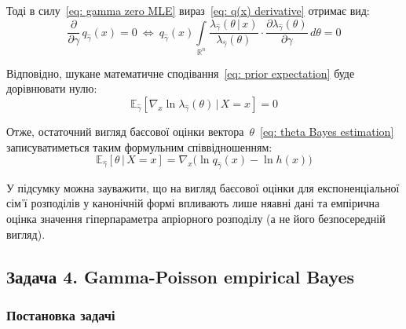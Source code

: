 \documentclass{mathreport}
\begin{document}
Тоді в силу~\eqref{eq: gamma zero MLE} вираз~\eqref{eq: q(x) derivative} отримає вид:
\begin{equation}
    \frac{\partial}{\partial \gamma}\, q_{\widehat{\gamma}}(x) = 0 
    \ \Longleftrightarrow \ 
    q_{\widehat{\gamma}}(x) \int\limits_{\mathbb{R}^n} \frac{\lambda_{\widehat{\gamma}}(\theta \,|\, x)}{\lambda_{\widehat{\gamma}}(\theta)} \cdot \frac{\partial \lambda_{\widehat{\gamma}}(\theta)}{\partial \gamma} \, d\theta = 0
\end{equation}

Відповідно, шукане математичне сподівання~\eqref{eq: prior expectation} буде дорівнювати нулю:
\begin{equation}
    \mathbb{E}_{\widehat{\gamma}} \left[ \nabla_x\ln{\lambda_{\widehat{\gamma}}(\theta)} \,|\, X=x \right] = 0
\end{equation}

Отже, остаточний вигляд баєсової оцінки вектора~$\theta$~\eqref{eq: theta Bayes estimation} записуватиметься таким формульним співвідношенням: 
\begin{equation}
    \mathbb{E}_{\widehat{\gamma}} \left[ \theta \,|\, X=x \right] = \nabla_x\bigl( \ln{q_{\widehat{\gamma}}(x)} - \ln{h(x)} \bigr)
\end{equation}

\begin{remark}
    У підсумку можна зауважити, що на вигляд баєсової оцінки для експоненціальної сім'ї розподілів у канонічній формі впливають лише няавні дані та емпірична оцінка значення гіперпараметра апріорного розподілу (а не його безпосередній вигляд).
\end{remark}

\newpage
\subsection*{Задача 4. Gamma-Poisson empirical Bayes}

\setcounter{subsection}{4}
\setcounter{equation}{0}

\subsubsection*{Постановка задачі}
\end{document}
